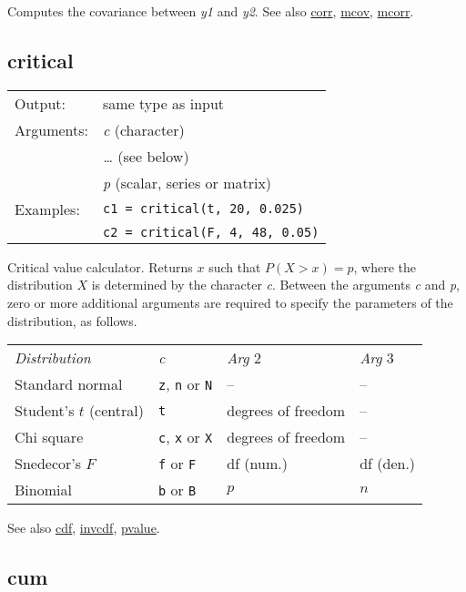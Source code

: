 	  Computes the covariance between \textsl{y1} and
	  \textsl{y2}. 
	  See also \hyperlink{func-corr}{corr}, \hyperlink{func-mcov}{mcov}, \hyperlink{func-mcorr}{mcorr}.

\subsection{critical}
\hypertarget{func-critical}{}

\begin{tabular}{ll}
Output:     & same type as input\\
Arguments:  & \textsl{c} (character)\\
           & \textsl{\dots{}} (see below)\\
           & \textsl{p} (scalar, series or matrix)\\
Examples:    & \texttt{c1 = critical(t, 20, 0.025)} \\ 
 & \texttt{c2 = critical(F, 4, 48, 0.05)}
\end{tabular}

	  Critical value calculator. Returns \ensuremath{x} such that
	  $P(X > x) = p$, where the distribution \ensuremath{X}
	  is determined by the character \textsl{c}. Between the
	  arguments \textsl{c} and \textsl{p}, zero or
	  more additional arguments are required to specify the parameters
	  of the distribution, as follows.

	  \begin{center} 
	  \begin{tabular}{llll} 
	  \textit{Distribution} & \textsl{c} &
	  \textit{Arg} 2 & \textit{Arg} 3 \\[4pt]
	  Standard normal & \texttt{z}, \texttt{n} or \texttt{N} &
	  -- & -- \\ 
	  Student's $t$ (central) & \texttt{t} & 
	  degrees of freedom & -- \\ 
	  Chi square & \texttt{c}, \texttt{x} or \texttt{X} & 
	  degrees of freedom & -- \\
	  Snedecor's $F$ & \texttt{f} or \texttt{F} & 
	  df (num.) & df (den.) \\ 
	  Binomial & \texttt{b} or \texttt{B} & 
	  $p$ & $n$ \\ 
	  \end{tabular}
	  \end{center}

	  See also \hyperlink{func-cdf}{cdf}, \hyperlink{func-invcdf}{invcdf}, \hyperlink{func-pvalue}{pvalue}.

\subsection{cum}
\hypertarget{func-cum}{}

